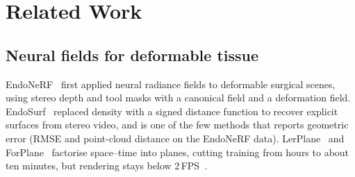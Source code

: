 \documentclass[conference]{IEEEtran}
\begin{document}
\section{Related Work}
\label{sec:related}

\subsection{Neural fields for deformable tissue}
EndoNeRF~\cite{wang2022endonerf} first applied neural radiance fields to deformable surgical scenes, using stereo depth and tool masks with a canonical field and a deformation field. EndoSurf~\cite{zha2023endosurf} replaced density with a signed distance function to recover explicit surfaces from stereo video, and is one of the few methods that reports geometric error (RMSE and point-cloud distance on the EndoNeRF data). LerPlane~\cite{yang2023lerplane} and ForPlane~\cite{yang2023forplane} factorise space--time into planes, cutting training from hours to about ten minutes, but rendering stays below 2\,FPS~\cite{huang2024endo4dgs,yang2024deform3dgs}.
\end{document}
